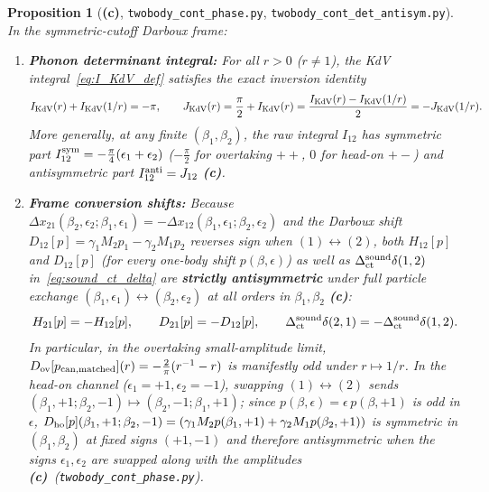 \documentclass[11pt,a4paper]{article}
\newcommand{\Lc}{\textbf{(c)}}
\newcommand{\script}[1]{\texttt{#1}}
\newtheorem{proposition}{Proposition}[section]
\begin{document}
\begin{proposition}[\Lc, \script{twobody\_cont\_phase.py}, \script{twobody\_cont\_det\_antisym.py}]\label{prop:sym_antisym}
In the symmetric-cutoff Darboux frame:
\begin{enumerate}
\item \textbf{Phonon determinant integral:} For all $r>0$ ($r\neq 1$), the KdV integral~\eqref{eq:I_KdV_def} satisfies the exact inversion identity
\begin{equation}\label{eq:I_KdV_inversion}
I_{\rm KdV}(r)+I_{\rm KdV}(1/r)=-\pi,\qquad
J_{\rm KdV}(r)=\frac{\pi}{2}+I_{\rm KdV}(r)=\frac{I_{\rm KdV}(r)-I_{\rm KdV}(1/r)}{2}=-J_{\rm KdV}(1/r).
\end{equation}
More generally, at any finite $(\beta_1,\beta_2)$, the raw integral $I_{12}$ has symmetric part $I_{12}^{\rm sym}=-\frac{\pi}{4}(\epsilon_1+\epsilon_2)$ ($-\frac{\pi}{2}$ for overtaking $++$, $0$ for head-on $+-$) and antisymmetric part $I_{12}^{\rm anti}=J_{12}$ \Lc.
\item \textbf{Frame conversion shifts:} Because $\Delta x_{21}(\beta_2,\epsilon_2;\beta_1,\epsilon_1)=-\Delta x_{12}(\beta_1,\epsilon_1;\beta_2,\epsilon_2)$ and the Darboux shift $D_{12}[p]=\gamma_1 M_2 p_1-\gamma_2 M_1 p_2$ reverses sign when $(1)\leftrightarrow(2)$, both $H_{12}[p]$ and $D_{12}[p]$ (for \emph{every} one-body shift $p(\beta,\epsilon)$) as well as $\Delta_{\rm ct}^{\rm sound}\delta(1,2)$ in~\eqref{eq:sound_ct_delta} are \textbf{strictly antisymmetric} under full particle exchange $(\beta_1,\epsilon_1)\leftrightarrow(\beta_2,\epsilon_2)$ at all orders in $\beta_1,\beta_2$ \Lc:
\begin{equation}\label{eq:strict_antisym}
H_{21}[p]=-H_{12}[p],\qquad D_{21}[p]=-D_{12}[p],\qquad \Delta_{\rm ct}^{\rm sound}\delta(2,1)=-\Delta_{\rm ct}^{\rm sound}\delta(1,2).
\end{equation}
In particular, in the overtaking small-amplitude limit, $D_{\rm ov}[p_{\rm can,matched}](r)=-\frac{2}{\pi}(r^{-1}-r)$ is manifestly odd under $r\mapsto 1/r$. In the head-on channel ($\epsilon_1=+1,\epsilon_2=-1$), swapping $(1)\leftrightarrow(2)$ sends $(\beta_1,+1;\beta_2,-1)\mapsto(\beta_2,-1;\beta_1,+1)$; since $p(\beta,\epsilon)=\epsilon\,p(\beta,+1)$ is odd in $\epsilon$, $D_{\rm ho}[p](\beta_1,+1;\beta_2,-1)=\left(\gamma_1 M_2 p(\beta_1,+1)+\gamma_2 M_1 p(\beta_2,+1)\right)$ is symmetric in $(\beta_1,\beta_2)$ at fixed signs $(+1,-1)$ and therefore \emph{antisymmetric} when the signs $\epsilon_1,\epsilon_2$ are swapped along with the amplitudes \Lc\ (\script{twobody\_cont\_phase.py}).
\end{enumerate}
\end{proposition}
\end{document}

